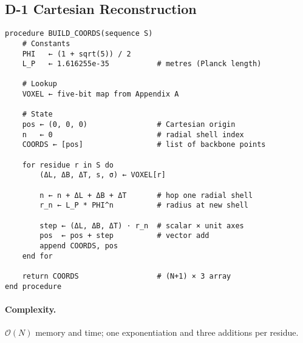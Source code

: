 \documentclass[11pt]{article}
\begin{document}
\subsection*{D-1  Cartesian Reconstruction}
\begin{verbatim}
procedure BUILD_COORDS(sequence S)
    # Constants
    PHI   ← (1 + sqrt(5)) / 2
    L_P   ← 1.616255e-35           # metres (Planck length)

    # Lookup
    VOXEL ← five-bit map from Appendix A

    # State
    pos ← (0, 0, 0)                # Cartesian origin
    n   ← 0                        # radial shell index
    COORDS ← [pos]                 # list of backbone points

    for residue r in S do
        (ΔL, ΔB, ΔT, s, σ) ← VOXEL[r]

        n ← n + ΔL + ΔB + ΔT       # hop one radial shell
        r_n ← L_P * PHI^n          # radius at new shell

        step ← (ΔL, ΔB, ΔT) ⋅ r_n  # scalar × unit axes
        pos  ← pos + step          # vector add
        append COORDS, pos
    end for

    return COORDS                  # (N+1) × 3 array
end procedure
\end{verbatim}

\paragraph{Complexity.}  
$\mathcal O(N)$ memory and time; one exponentiation and three additions
per residue.

\bigskip
\end{document}
